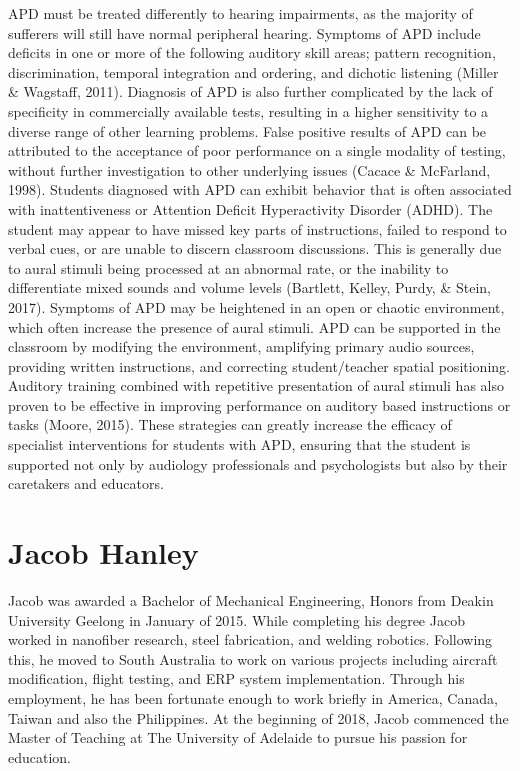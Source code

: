\documentclass[twoside,12pt,a4paper,notitlepage]{memoir}
\begin{document}
APD must be treated differently to hearing impairments, as the majority of sufferers will still have normal peripheral hearing. Symptoms of APD include deficits in one or more of the following auditory skill areas; pattern recognition, discrimination, temporal integration and ordering, and dichotic listening (Miller \& Wagstaff, 2011). Diagnosis of APD is also further complicated by the lack of specificity in commercially available tests, resulting in a higher sensitivity to a diverse range of other learning problems. False positive results of APD can be attributed to the acceptance of poor performance on a single modality of testing, without further investigation to other underlying issues (Cacace \& McFarland, 1998). Students diagnosed with APD can exhibit behavior that is often associated with inattentiveness or Attention Deficit Hyperactivity Disorder (ADHD). The student may appear to have missed key parts of instructions, failed to respond to verbal cues, or are unable to discern classroom discussions. This is generally due to aural stimuli being processed at an abnormal rate, or the inability to differentiate mixed sounds and volume levels (Bartlett, Kelley, Purdy, \& Stein, 2017). Symptoms of APD may be heightened in an open or chaotic environment, which often increase the presence of aural stimuli. APD can be supported in the classroom by modifying the environment, amplifying primary audio sources, providing written instructions, and correcting student/teacher spatial positioning. Auditory training combined with repetitive presentation of aural stimuli has also proven to be effective in improving performance on auditory based instructions or tasks (Moore, 2015). These strategies can greatly increase the efficacy of specialist interventions for students with APD, ensuring that the student is supported not only by audiology professionals and psychologists but also by their caretakers and educators.

\section*{Jacob Hanley}

Jacob was awarded a Bachelor of Mechanical Engineering, Honors from Deakin University Geelong in January of 2015.
While completing his degree Jacob worked in nanofiber research, steel fabrication, and welding robotics. Following this, he moved to South Australia to work on various projects including aircraft modification, flight testing, and ERP system implementation. Through his employment, he has been fortunate enough to work briefly in America, Canada, Taiwan and also the Philippines.
At the beginning of 2018, Jacob commenced the Master of Teaching at The University of Adelaide to pursue his passion for education.
\end{document}
